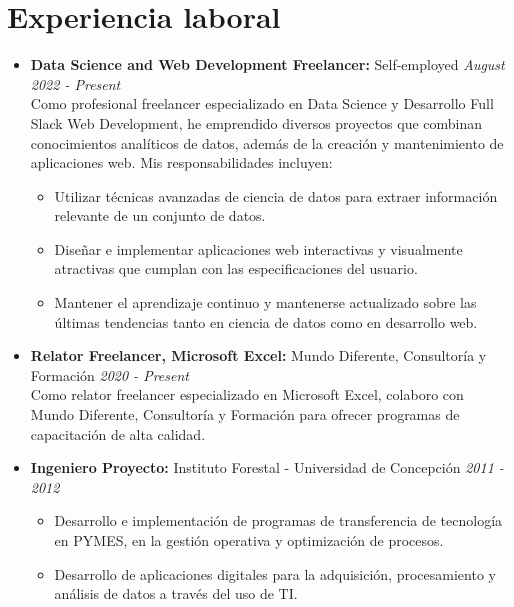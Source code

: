 \documentclass[a4paper,10pt]{article}
\begin{document}
	\section*{Experiencia laboral}
		\begin{itemize}[left=0pt]
			\item \textbf{\large Data Science and Web Development Freelancer:} Self-employed \hfill \textit{August 2022 - Present} \\
			\small Como profesional freelancer especializado en Data Science y Desarrollo Full Slack Web Development, he emprendido diversos proyectos que combinan conocimientos analíticos de datos, además de la creación y mantenimiento de aplicaciones web. Mis responsabilidades incluyen:
			\begin{itemize}[left=10pt]
				\item Utilizar técnicas avanzadas de ciencia de datos para extraer información relevante de un conjunto de datos.
				\item Diseñar e implementar aplicaciones web interactivas y visualmente atractivas que cumplan con las especificaciones del usuario.
				\item Mantener el aprendizaje continuo y mantenerse actualizado sobre las últimas tendencias tanto en ciencia de datos como en desarrollo web.
			\end{itemize}
			
			\item \textbf{\large Relator Freelancer, Microsoft Excel:} Mundo Diferente, Consultoría y Formación \hfill \textit{2020 - Present} \\
			\small Como relator freelancer especializado en Microsoft Excel, colaboro con Mundo Diferente, Consultoría y Formación para ofrecer programas de capacitación de alta calidad. 
			
			\item \textbf{\large Ingeniero Proyecto:} Instituto Forestal - Universidad de Concepción \hfill \textit{2011 - 2012}
			\begin{itemize}[left=10pt, topsep=0pt]
				\item Desarrollo e implementación de programas de transferencia de tecnología en PYMES, en la gestión operativa y optimización de procesos.
				\item Desarrollo de aplicaciones digitales para la adquisición, procesamiento y análisis de datos a través del uso de TI.
			\end{itemize}
		

\end{itemize}
\end{document}
